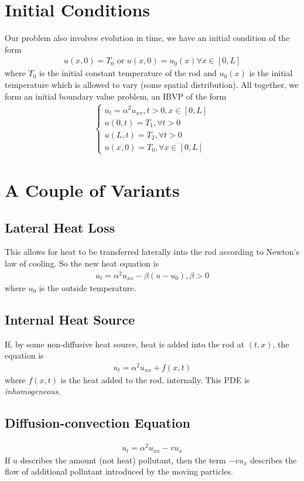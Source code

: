 \documentclass{book}
\theoremstyle{definition}
\begin{document}
\section{Initial Conditions}
Our problem also involves evolution in time, we have an initial condition of the form
\begin{align*}
u(x,0) = T_0 \text{ or } u(x,0) = u_0(x) \forall x \in [0,L]
\end{align*}
where $T_0$ is the initial constant temperature of the rod and $u_0(x)$ is the initial temperature which is allowed to vary (some spatial distribution). All together, we form an initial boundary value problem, an IBVP of the form
\begin{align*}
\begin{cases*}
u_t = \alpha^2 u_{xx}, t>0,x\in[0,L]\\
u(0,t) = T_1, \forall t > 0\\
u(L,t) = T_2,\forall t > 0\\
u(x,0) = T_0, \forall x\in[0,L]
\end{cases*} 
\end{align*}
\section{A Couple of Variants}
\subsection{Lateral Heat Loss}
This allows for heat to be transferred laterally into the rod according to Newton's law of cooling. So the new heat equation is
\begin{align*}
u_t = \alpha^2 u_{xx} -\beta(u - u_0), \beta > 0
\end{align*}
where $u_0$ is the outside temperature.
\subsection{Internal Heat Source}
If, by some non-diffusive heat source, heat is added into the rod at $(t,x)$, the equation is
\begin{align*}
u_t = \alpha^2 u_{xx} + f(x,t)
\end{align*}
where $f(x,t)$ is the heat added to the rod, internally. This PDE is \textit{inhomogeneous}.
\subsection{Diffusion-convection Equation}
\begin{align*}
u_t = \alpha^2 u_{xx} - vu_x
\end{align*}
If $u$ describes the amount (not heat) pollutant, then the term $-vu_x$ describes the flow of additional pollutant introduced by the moving particles. 
\end{document}
